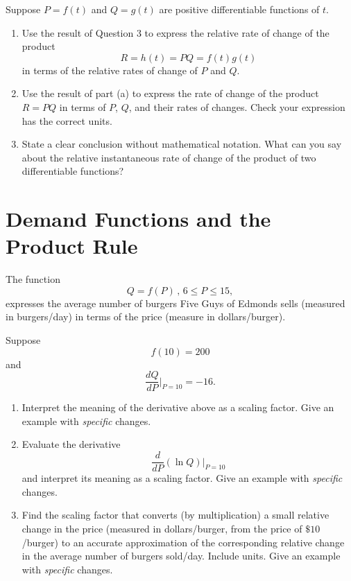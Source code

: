 \documentclass{ximera}
\begin{document}
\begin{question} \label{Qppv3frr}
Suppose $P=f(t)$ and $Q=g(t)$ are positive differentiable functions of $t$. 

\begin{enumerate}
\item Use the result of Question 3 to express the relative rate of change of the product 
\[
   R = h(t) =  PQ = f(t)g(t)
\]
in terms of the relative rates of change of $P$ and $Q$.

\item Use the result of part (a) to express the rate of change of the product $R=PQ$ in terms of $P$, $Q$, and their rates of changes. Check your expression has the correct units.

\item State a clear conclusion without mathematical notation. What can you say about the relative instantaneous rate of change of the product of two differentiable functions?

\begin{freeResponse}
\end{freeResponse}

\end{enumerate}
\end{question}


\section{Demand Functions and the Product Rule}

\begin{question} \label{Qpvm3f33frnb9}
The function 
\[
    Q = f(P) \, , \, 6 \leq P \leq 15,
\]
expresses the average number of burgers Five Guys of Edmonds sells (measured in burgers/day) in terms of the price (measure in dollars/burger).

Suppose 
\[
     f(10) = 200
\]
and
\[
   \frac{dQ}{dP}\Big|_{P=10} = -16.
\]

\begin{enumerate}
\item Interpret the meaning of the derivative above as a scaling factor. Give an example with \emph{specific} changes.

\item Evaluate the derivative 
\[
      \frac{d}{dP} \left( \ln Q  \right)\Big|_{P=10}
\]
and interpret its meaning as a scaling factor. Give an example with \emph{specific} changes.

\item Find the scaling factor that converts (by multiplication) a small relative change in the price (measured in dollars/burger, from the price of $\$10$/burger) to an accurate approximation of the corresponding relative change in the average number of burgers sold/day. Include units. Give an example with \emph{specific} changes.

\end{enumerate}
\end{question}
\end{document}
